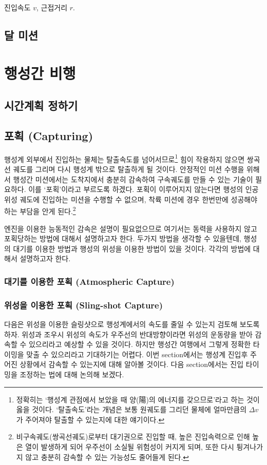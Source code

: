 \documentclass[9pt,twoside,openany]{amsbook}
\begin{document}
진입속도 $v$, 근접거리 $r$.

\chapter{달 미션}

\part{행성간 비행}
\chapter{시간계획 정하기}
\chapter{포획 (Capturing)}
행성계 외부에서 진입하는 물체는 탈출속도를 넘어서므로\footnote{정확히는 `행성계 관점에서 보았을 때 양(陽)의 에너지를 갖으므로'라고 하는 것이 옳을 것이다. `탈출속도'라는 개념은 보통 원궤도를 그리던 물체에 얼마만큼의 $\Delta v$가 주어져야 탈출할 수 있는지에 대한 얘기이다.} 힘이 작용하지 않으면 쌍곡선 궤도를 그리며 다시 행성계 밖으로 탈출하게 될 것이다.
안정적인 미션 수행을 위해서 행성간 미션에서는 도착지에서 충분히 감속하여 구속궤도를 만들 수 있는 기술이 필요하다. 이를 `포획'이라고 부르도록 하겠다. 포획이 이루어지지 않는다면 행성의 인공위성 궤도에 진입하는 미션을 수행할 수 없으며, 착륙 미션에 경우 한번만에 성공해야 하는 부담을 안게 된다.\footnote{비구속궤도(쌍곡선궤도)로부터 대기권으로 진입할 때, 높은 진입속력으로 인해 높은 열이 발생하게 되어 우주선이 소실될 위험성이 커지게 되며, 또한 다시 튕겨나가지 않고 충분히 감속할 수 있는 가능성도 줄어들게 된다.}

엔진을 이용한 능동적인 감속은 설명이 필요없으므로 여기서는 동력을 사용하지 않고 포획당하는 방법에 대해서 설명하고자 한다. 두가지 방법을 생각할 수 있을텐데, 행성의 대기를 이용한 방법과 행성의 위성을 이용한 방법이 있을 것이다. 각각의 방법에 대해서 설명하고자 한다.
\section{대기를 이용한 포획 (Atmospheric Capture)}
\section{위성을 이용한 포획 (Sling-shot Capture)}
다음은 위성을 이용한 슬링샷으로 행성계에서의 속도를 줄일 수 있는지 검토해 보도록 하자. 위성과 조우시 위성의 속도가 우주선의 반대방향이라면 위성의 운동량을 받아 감속할 수 있으리라고 예상할 수 있을 것이다. 하지만 행성간 여행에서 그렇게 정확한 타이밍을 맞출 수 있으리라고 기대하기는 어렵다. 이번 section에서는 행성계 진입후 주어진 상황에서 감속할 수 있는지에 대해 알아볼 것이다. 다음 section에서는 진입 타이밍을 조정하는 법에 대해 논의해 보겠다.
\end{document}
